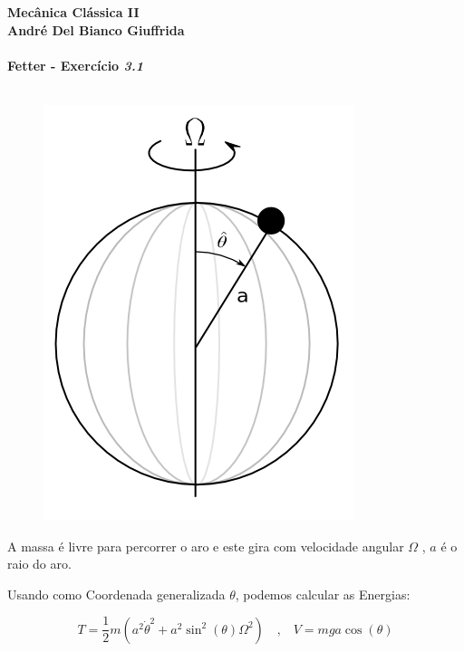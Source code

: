 \documentclass[a4paper,11pt]{exam}
\begin{document}
\begingroup 
	  \bf \Large Mecânica Clássica II\\
	  \indent \normalsize André Del Bianco Giuffrida
	\endgroup
	\\ \quad
	\\
	\large{Fetter - Exercício \emph{3.1}}
	\\
	\\
	\normalsize
	\begin{figure}[h]
		\centering
		\includegraphics[scale=0.5]{Im.png}
	\end{figure}
	
	A massa é livre para percorrer o aro e este gira com velocidade angular $\Omega$ , $a$ é o raio 
	do aro.
	
	Usando como Coordenada generalizada $\theta$, podemos calcular as Energias:
	
	\[ T = \frac{1}{2} m  (a^2 \dot\theta^2 + a^2 \sin^2(\theta) \Omega^2) \quad \text{,} \quad V = mga\cos{(\theta)}\]
	
\end{document}
